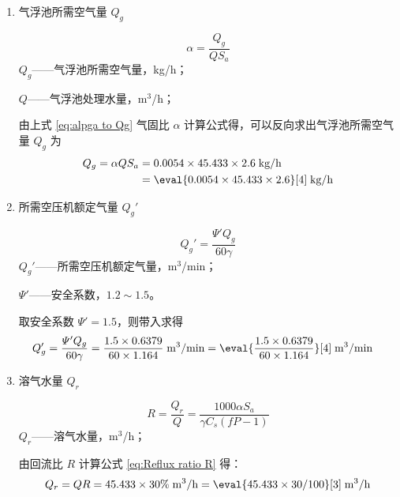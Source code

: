 \begin{enumerate}
	\item 气浮池所需空气量 $Q_g$
	
	\begin{equation}\label{eq:alpga to Qg}
		\alpha = \dfrac{Q_g}{Q S_a}
	\end{equation}
	$Q_g$——气浮池所需空气量，kg/h；\par
	$Q$——气浮池处理水量，m$^3$/h； \par
	由上式 \ref{eq:alpga to Qg} 气固比 $\alpha$ 计算公式得，可以反向求出气浮池所需空气量 $Q_g$ 为
	\begin{align*}
		Q_g = \alpha Q S_a &= 0.0054 \times 45.433 \times 2.6 \;\text{kg/h} \\
		&= \eval{0.0054 \times 45.433 \times 2.6}[4] \;\text{kg/h}
	\end{align*}

	\item 所需空压机额定气量 $Q_g'$
	
	\begin{equation}
		Q_g'=\dfrac{\varPsi' Q_g}{60\gamma}
	\end{equation}
	$Q_g'$——所需空压机额定气量，m$^3$/min；\par
	$\varPsi'$——安全系数，$1.2\sim 1.5$。

	取安全系数 $\varPsi'=1.5$，则带入求得
	\begin{align*}
		Q_g'=\dfrac{\varPsi' Q_g}{60\gamma} &=\dfrac{1.5\times 0.6379}{60\times 1.164} \;\text{m$^3$/min} = \eval{\dfrac{1.5\times 0.6379}{60\times 1.164}}[4] \;\text{m$^3$/min}
	\end{align*}

	\item 溶气水量 $Q_r$
	
	\begin{equation} \label{eq:Reflux ratio R}
		R=\dfrac{Q_r}{Q}=\dfrac{1000\alpha S_a}{\gamma C_s(fP-1)}
	\end{equation}
	$Q_r$——溶气水量，m$^3$/h；\par

	由回流比 $R$ 计算公式 \ref{eq:Reflux ratio R} 得：
	\begin{equation}
		Q_r=QR = 45.433\times 30\% \;\text{m$^3$/h} = \eval{45.433\times 30/100}[3] \;\text{m$^3$/h}
	\end{equation}
\end{enumerate}


	
